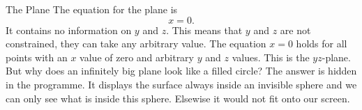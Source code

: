 \begin{surferPage}[Plane]{The Plane}
The equation for the plane is \[x=0.\] It contains no information on $y$ and $z$. This means that $y$ and $z$ are not constrained, they can take any arbitrary value.
The equation $x=0$ holds for all points with an $x$ value of zero and arbitrary $y$ and $z$ values. This is the $yz$-plane.
\newline \newline
But why does an infinitely big plane look like a filled circle? The answer is hidden in the programme. It displays the surface always inside an invisible sphere and we can only see what is inside this sphere. Elsewise it would not fit onto our screen.
\end{surferPage}
